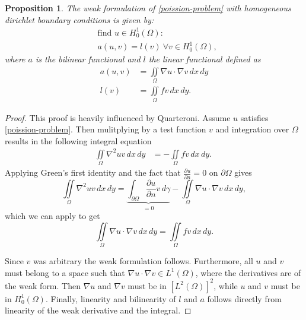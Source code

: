 \documentclass[5pt,a4paper,english]{elsarticle}%
\newtheorem{proposition}[theorem]{Proposition}
\begin{document}
\begin{proposition}
    The weak formulation of \eqref{poission-problem} with homogeneous dirichlet boundary conditions is given by:  
    \begin{equation*}
        \begin{aligned}
        &\text{find } u \in H_0^{1}(\Omega) : 
        \\
        &a(u,v) = l(v) \ \forall v \in H_0^{1}(\Omega), 
        \end{aligned}
    \end{equation*}
    where $a$ is the bilinear functional and $l$ the linear functional defined as 
    \begin{equation*}
        \begin{aligned}
            a(u,v) &= \iint\limits_{\Omega} \nabla u \cdot \nabla v \, dx \, dy
            \\
            l(v) &= \iint\limits_{\Omega} fv \, dx \, dy.
        \end{aligned}
    \end{equation*}
\end{proposition}
\begin{proof}
    This proof is heavily influenced by Quarteroni\cite[p. 44-45]{AQuart}.
    Assume $u$ satisfies \eqref{poission-problem}. Then mulitplying by a test function $v$ and integration over $\Omega$ results in the following integral equation
    \begin{equation}
        \label{weak-start}
        \begin{aligned}
            \iint\limits_{\Omega} \nabla^2uv \, dx \, dy &=  -\iint\limits_{\Omega} fv \, dx \, dy.\ 
        \end{aligned}
    \end{equation}
    Applying Green's first identity and the fact that $\frac{\partial u}{\partial n} = 0$ on $\partial \Omega$ gives
    \begin{equation}
        \iint\limits_{\Omega} \nabla^2 u v \, dx \, dy 
        = \underbrace{\int_{\partial \Omega} \frac{\partial u}{\partial n} v \, d\gamma}_{=0} - \iint\limits_{\Omega} \nabla u \cdot \nabla v  \, dx \, dy,
        \label{greens-identety}
    \end{equation}
    which we can apply to get 
    \begin{equation}
        \iint\limits_{\Omega} \nabla u \cdot \nabla v \, dx \, dy = 
        \iint\limits_{\Omega} fv \, dx \, dy.
    \end{equation}
    
    Since $v$ was arbitrary the weak formulation follows. Furthermore, all $u$ and $v$ must belong to a space such that $\nabla u \cdot \nabla v \in {L^1}(\Omega)$, where the derivatives are of the weak form. Then $\nabla u$ and $\nabla v$ must be in $\left[{L^2}(\Omega)\right]^2$, while $u$ and $v$ must be in ${H^1_0}(\Omega)$. Finally, linearity and bilinearity of $l$ and $a$ follows directly from linearity of the weak derivative and the integral.
\end{proof}
\end{document}
